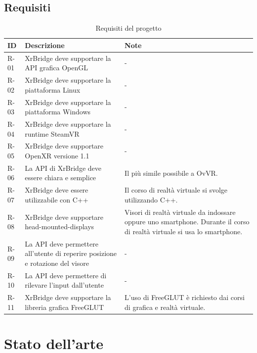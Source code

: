 \documentclass[twoside]{supsistudent}
\begin{document}
\section{Requisiti}

\begin{table}[H]
  \caption{Requisiti del progetto}
  \begin{center}
    \begin{tabular}{ | m{1cm} | m{6cm} | m{6cm} | }
      \hline
      ID   & Descrizione & Note \\
      \hline
      R-01 & XrBridge deve supportare la API grafica OpenGL & - \\
      \hline
      R-02 & XrBridge deve supportare la piattaforma Linux & - \\
      \hline
      R-03 & XrBridge deve supportare la piattaforma Windows & - \\
      \hline
      R-04 & XrBridge deve supportare la runtime SteamVR & - \\
      \hline
      R-05 & XrBridge deve supportare OpenXR versione 1.1 & - \\
      \hline
      R-06 & La API di XrBridge deve essere chiara e semplice & Il più simile possibile a OvVR. \\
      \hline
      R-07 & XrBridge deve essere utilizzabile con C++ & Il corso di realtà virtuale si svolge utilizzando C++. \\
      \hline
      R-08 & XrBridge deve supportare head-mounted-displays & Visori di realtà virtuale da indossare oppure uno smartphone. Durante il corso di realtà virtuale si usa lo smartphone. \\
      \hline
      R-09 & La API deve permettere all'utente di reperire posizione e rotazione del visore & - \\
      \hline
      R-10 & La API deve permettere di rilevare l'input dall'utente & - \\
      \hline
      R-11 & XrBridge deve supportare la libreria grafica FreeGLUT & L'uso di FreeGLUT è richiesto dai corsi di grafica e realtà virtuale. \\
      \hline
    \end{tabular}
  \end{center}
\end{table}

\chapter{Stato dell'arte}
\end{document}
